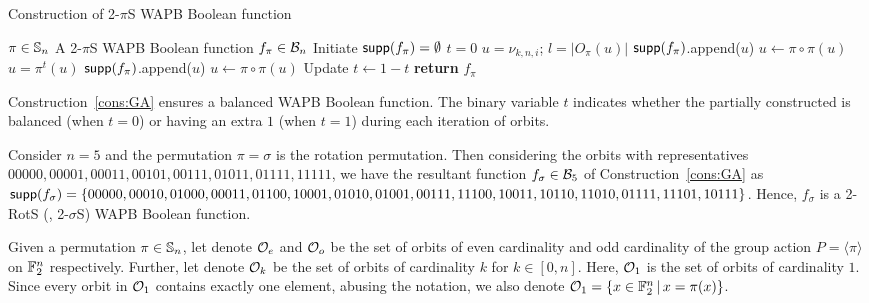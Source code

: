 \documentclass{llncs}
\begin{document}
\begin{constr}
\caption{Construction of 2-$\pi$S WAPB Boolean function\label{cons:GA}}
\begin{algorithmic}
\Require $\pi \in \mathbb{S}_n$ %
\Ensure A 2-$\pi$S WAPB Boolean function $f_\pi \in \mathcal{B}_n$
\State Initiate $\mathsf{supp}(f_\pi) = \emptyset$
\State $t = 0$
		\State $u = \nu_{k,n,i}$; $l= |O_\pi(u)|$
				\State $\mathsf{supp}(f_\pi)$.append($u$)
				\State $ u \gets \pi \circ \pi(u)$
			\EndFor
		\Else
			\State $u = \pi^{t}(u)$
				\State $\mathsf{supp}(f_\pi)$.append($u$)
				\State $ u \gets \pi \circ \pi(u)$ 
			\EndFor 
			\State Update $t \gets 1 - t$
		\EndIf
	\EndFor
\EndFor
\State \textbf{return} $f_\pi$
\end{algorithmic}

\end{constr}
Construction~\ref{cons:GA} ensures a balanced WAPB Boolean function. 
The binary variable $t$ indicates whether the partially constructed is balanced (when $t = 0$) or having an extra $1$ (when $t = 1$) during each iteration of orbits.
\begin{example}
Consider $n = 5$ and the permutation $\pi = \sigma$ is the rotation permutation. Then considering the orbits with representatives $00000, 00001, 00011, 00101, 00111, 01011, 01111, 11111$, we have the resultant function $f_{\sigma} \in \mathcal{B}_{5}$ of Construction~\ref{cons:GA} as $\mathsf{supp}(f_{\sigma}) = \{00000, 00010, 01000, 00011, 01100, 10001, 01010, 01001, 00111,\\ 11100, 10011, 10110, 11010, 01111, 11101, 10111\}$.
Hence, $f_{\sigma}$ is a 2-RotS (\ie, 2-$\sigma$S) WAPB Boolean function.
\end{example}

Given a permutation $\pi \in \mathbb{S}_n$, let denote $\mathcal{O}_e$ and $\mathcal{O}_o$ be the set of orbits of even cardinality and  odd cardinality of the group action $P = \langle \pi \rangle$ on $\mathbb{F}_2^n$ respectively. Further, let denote $\mathcal{O}_k$ be the set of orbits of cardinality $k$ for $k \in [0,n]$. Here, $\mathcal{O}_1$ is the set of orbits of cardinality $1$. Since every orbit in $\mathcal{O}_1$ contains exactly one element, abusing the notation, we also denote $\mathcal{O}_1 = \{x \in \mathbb{F}_2^n \, | \, x = \pi(x)\}$.
\end{document}
